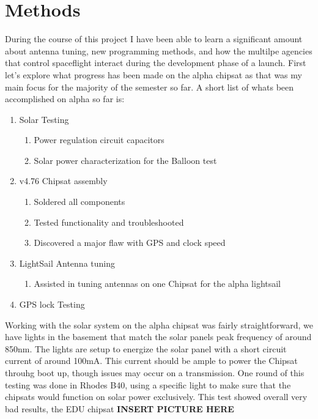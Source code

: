 \section{Methods}
During the course of this project I have been able to learn a significant amount about antenna tuning, new programming methods, and how the multilpe agencies that control spaceflight interact during the development phase of a launch.
First let's explore what progress has been made on the alpha chipsat as that was my main focus for the majority of the semester so far. A short list of whats been accomplished on alpha so far is:
\begin{enumerate}
    \item Solar Testing
        \begin{enumerate}
        \item Power regulation circuit capacitors
        \item Solar power characterization for the Balloon test
        \end{enumerate}
    \item v4.76 Chipsat assembly
        \begin{enumerate}
        \item Soldered all components
        \item Tested functionality and troubleshooted
        \item Discovered a major flaw with GPS and clock speed
        \end{enumerate}
    \item LightSail Antenna tuning
        \begin{enumerate}
        \item Assisted in tuning antennas on one Chipsat for the alpha lightsail
        \end{enumerate}
    \item GPS lock Testing
\end{enumerate}

Working with the solar system on the alpha chipsat was fairly straightforward, we have lights in the basement that match the solar panels peak frequency of around 850nm. The lights are setup to energize the solar panel with a short circuit current of around 100mA. This current should be ample to power the Chipsat throuhg boot up, though issues may occur on a transmission.
One round of this testing was done in Rhodes B40, using a specific light to make sure that the chipsats would function on solar power exclusively. This test showed overall very bad results, the EDU chipsat 
\textbf{INSERT PICTURE HERE}
